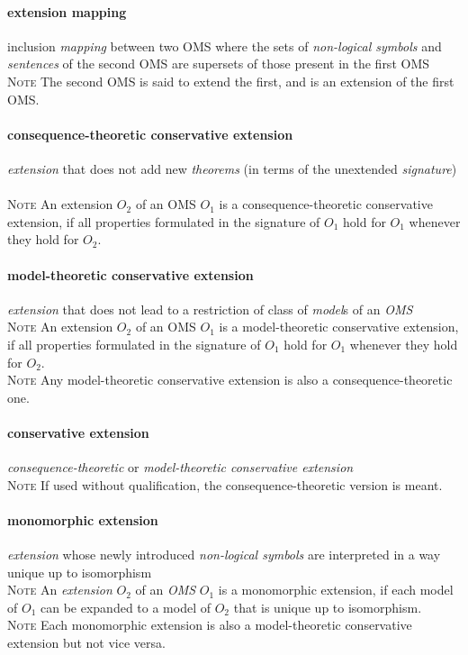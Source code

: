 \documentclass[10pt,%
\ifpretendfinal
final%
\else
draft%
\fi,
]{scrreprt}
\newcommand*{\termref}[1]{\textit{#1}}
\newcommand{\termdefinition}[2]{\paragraph{#1} #2}
\newenvironment{definitions}[0]{\medskip }{}
\newenvironment{note}[0]{\ \\ \textsc{Note} \quad}{}
\begin{document}
\begin{definitions}
   \termdefinition{extension mapping}{inclusion \termref{mapping} between two
   OMS where the sets of \termref{non-logical symbols} and
   \termref{sentences} of the second OMS are supersets of those
   present in the first OMS} 
\begin{note} 
The second OMS is said to extend the first, and is an extension of the
first OMS.
\end{note} 

  \termdefinition{consequence-theoretic conservative extension}{\termref{extension} that does
   not add new \termref{theorems} (in terms of the unextended \termref{signature})}
  \begin{note}
    An extension $O_2$ of an OMS $O_1$ is a consequence-theoretic conservative extension, if all properties formulated in the signature of $O_1$ hold for $O_1$ whenever they hold for $O_2$.
  \end{note}

  \termdefinition{model-theoretic conservative extension}{\termref{extension}
   that does not lead to a restriction of class of \termref{model}s of an \termref{OMS}}
  \begin{note}
    An extension $O_2$ of an OMS $O_1$ is a model-theoretic conservative extension, if all properties formulated in the signature of $O_1$ hold for $O_1$ whenever they hold for $O_2$.
  \end{note}
  \begin{note}
   Any model-theoretic conservative extension is also a consequence-theoretic one.
  \end{note}

  \termdefinition{conservative extension}{\termref{consequence-theoretic} or \termref{model-theoretic conservative extension}}
  \begin{note}
   If used without qualification, the consequence-theoretic version is meant.
  \end{note}

  \termdefinition{monomorphic extension}{\termref{extension} whose newly introduced
   \termref{non-logical symbols} are interpreted in a way unique up to isomorphism}
  \begin{note}
An \termref{extension} $O_2$ of an \termref{OMS} $O_1$ is a monomorphic extension, if each model of $O_1$ can be expanded to a model of $O_2$ that is unique up to isomorphism.
  \end{note}
  \begin{note}
    Each monomorphic extension is also a model-theoretic conservative extension but not vice versa.
  \end{note}


\end{definitions}
\end{document}

